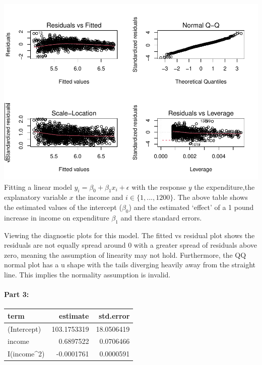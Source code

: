 \documentclass[
]{article}
\begin{document}
\includegraphics{Draft_1_files/figure-latex/unnamed-chunk-6-1.pdf}
Fitting a linear model \(y_{i}=\beta_{0}+\beta_{1}x_{i}+\epsilon\) with
the response \(y\) the expenditure,the explanatory variable \(x\) the
income and \(i \in \{1,...,1200\}\). The above table shows the estimated
values of the intercept (\(\beta_0\)) and the estimated `effect' of a 1
pound increase in income on expenditure \(\beta_1\) and there standard
errors.

Viewing the diagnostic plots for this model. The fitted vs residual plot
shows the residuals are not equally spread around 0 with a greater
spread of residuals above zero, meaning the assumption of linearity may
not hold. Furthermore, the QQ normal plot has a u shape with the tails
diverging heavily away from the straight line. This implies the
normality assumption is invalid.

\hypertarget{part-3}{%
\paragraph{Part 3:}\label{part-3}}

\begin{table}
\centering\begingroup\fontsize{15}{17}\selectfont

\begin{tabular}{l|r|r}
\hline
term & estimate & std.error\\
\hline
(Intercept) & 103.1753319 & 18.0506419\\
\hline
income & 0.6897522 & 0.0706466\\
\hline
I(income^2) & -0.0001761 & 0.0000591\\
\hline
\end{tabular}
\endgroup{}
\end{table}
\end{document}

